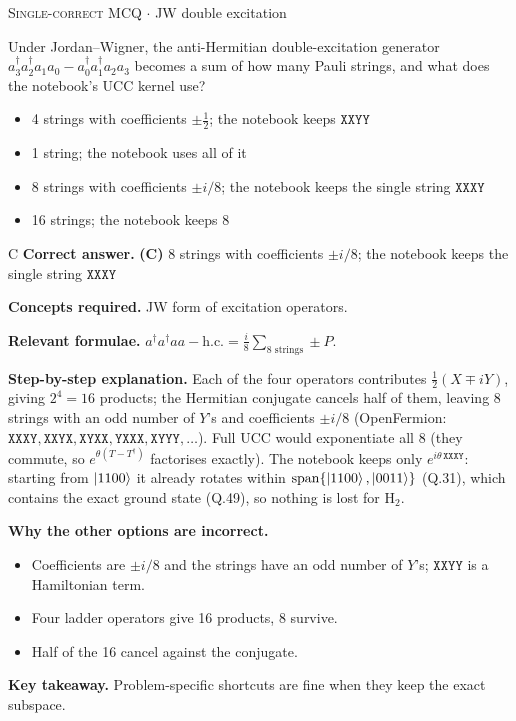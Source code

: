 \documentclass[11pt,a4paper]{article}
\newcommand{\optlabel}[1]{\textbf{(#1)}}
\newcommand{\correctlabel}[1]{\textcolor{okgreen}{\textbf{(#1)}\,\ding{51}}}
\newenvironment{qitem}[1]{\begin{list}{}{\setlength{\leftmargin}{3.3em}\setlength{\labelwidth}{3.1em}%
  \setlength{\labelsep}{0.2em}\setlength{\topsep}{3pt}\setlength{\parsep}{3pt}}\item[\textbf{Q.#1}\hfill]}{\end{list}}
\newcommand{\qsep}{\par\vspace{2pt}{\color{black!15}\hrule}\vspace{4pt}}
\newcommand{\qmeta}[2]{{\footnotesize\color{black!60}\textsc{#1} \;$\cdot$\; #2}\par}
\begin{document}
\begin{qitem}{67}
\qmeta{Single-correct MCQ}{JW double excitation}
Under Jordan--Wigner, the anti-Hermitian double-excitation generator $a_3^\dagger a_2^\dagger a_1a_0 - a_0^\dagger a_1^\dagger a_2a_3$ becomes a sum of how many Pauli strings,
and what does the notebook's UCC kernel use?
\begin{itemize}[leftmargin=2.6em, labelsep=0.4em, itemsep=2pt, topsep=3pt]
\item[\optlabel{A}] 4 strings with coefficients $\pm\tfrac12$; the notebook keeps $\texttt{XXYY}$
\item[\optlabel{B}] 1 string; the notebook uses all of it
\item[\correctlabel{C}] 8 strings with coefficients $\pm i/8$; the notebook keeps the single string $\texttt{XXXY}$
\item[\optlabel{D}] 16 strings; the notebook keeps 8
\end{itemize}
\end{qitem}
\begin{solbox}{C}
\textbf{\color{brand}Correct answer.} \textcolor{okgreen}{\textbf{(C)}} 8 strings with coefficients $\pm i/8$; the notebook keeps the single string $\texttt{XXXY}$

\textbf{\color{brand}Concepts required.} JW form of excitation operators.

\textbf{\color{brand}Relevant formulae.} $a^\dagger a^\dagger aa - \text{h.c.} = \frac i8\sum_{8\text{ strings}}\pm P$.

\textbf{\color{brand}Step-by-step explanation.} Each of the four operators contributes $\tfrac12(X \mp iY)$, giving $2^4 = 16$ products; the Hermitian conjugate cancels half of them, leaving 8 strings
with an odd number of $Y$'s and coefficients $\pm i/8$ (OpenFermion: $\texttt{XXXY}, \texttt{XXYX}, \texttt{XYXX}, \texttt{YXXX}, \texttt{XYYY}, \dots$). Full UCC
would exponentiate all 8 (they commute, so $e^{\theta(T - T^\dagger)}$ factorises exactly). The notebook keeps only $e^{i\theta\,\texttt{XXXY}}$: starting from $\ket{1100}$ it
already rotates within $\mathrm{span}\{\ket{1100}, \ket{0011}\}$ (Q.31), which contains the exact ground state (Q.49), so nothing is lost for H$_2$.

\textbf{\color{brand}Why the other options are incorrect.}
\begin{itemize}[leftmargin=2.4em, itemsep=1pt, topsep=2pt]
\item[\textbf{(A)}] Coefficients are $\pm i/8$ and the strings have an odd number of $Y$'s; $\texttt{XXYY}$ is a Hamiltonian term.
\item[\textbf{(B)}] Four ladder operators give 16 products, 8 survive.
\item[\textbf{(D)}] Half of the 16 cancel against the conjugate.
\end{itemize}
\textbf{\color{brand}Key takeaway.} Problem-specific shortcuts are fine when they keep the exact subspace.
\end{solbox}
\qsep
\end{document}
